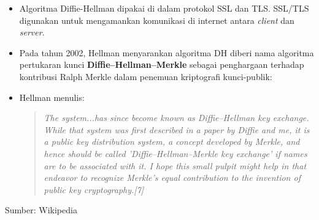 \documentclass{article}
\begin{document}

\begin{itemize}
    \item Algoritma Diffie-Hellman dipakai di dalam protokol SSL dan TLS. SSL/TLS digunakan untuk mengamankan komunikasi di internet antara \textit{client} dan \textit{server}.
    \item Pada tahun 2002, Hellman menyarankan algoritma DH diberi nama algoritma pertukaran kunci \textbf{Diffie--Hellman--Merkle} sebagai penghargaan terhadap kontribusi Ralph Merkle dalam penemuan kriptografi kunci-publik:
    \item Hellman menulis:
    \begin{quote}
    \textit{The system...has since become known as Diffie--Hellman key exchange. While that system was first described in a paper by Diffie and me, it is a public key distribution system, a concept developed by Merkle, and hence should be called 'Diffie--Hellman--Merkle key exchange' if names are to be associated with it. I hope this small pulpit might help in that endeavor to recognize Merkle's equal contribution to the invention of public key cryptography.[7]}
    \end{quote}
\end{itemize}

\begin{flushright}
Sumber: Wikipedia
\end{flushright}
\end{document}
